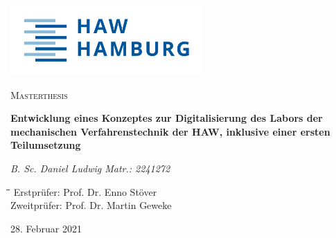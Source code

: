 \begin{titlepage}
	\centering



	\begin{flushright}
		\vspace{-30em}
	\includegraphics[width=0.55\textwidth, cfbox=CornflowerBlue!50	 2pt 0.25pt,
	 cfbox=NavyBlue!70	 3pt 0.75pt]{Bilder/HAW-Logo.png}
	\end{flushright}\par
\vspace{-.25em}
	\vspace{1cm}
	{\scshape\Large Masterthesis\par}
	\vspace{1.5cm}
	{\huge\bfseries Entwicklung eines Konzeptes zur Digitalisierung des Labors der
mechanischen Verfahrenstechnik der HAW, inklusive einer ersten
Teilumsetzung \par}
	\vspace{1.5cm}
	{\Large\itshape B. Sc. Daniel Ludwig Matr.: 2241272\par}
	\vfill
	\par
	\vspace{0.55cm}
	\vspace{1em}
	\begin{tabbing}
	\hspace{20pt}\=\hspace{80pt}\=\hspace{200pt}\=\kill
	\> Erstprüfer: \> Prof. Dr. Enno Stöver \\
	\> Zweitprüfer: \> Prof. Dr. Martin Geweke \\
	\end{tabbing}
	\vfill

	{\large 28. Februar 2021\par}
\end{titlepage}